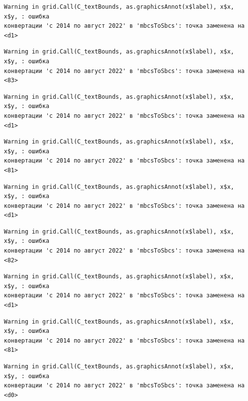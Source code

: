 \documentclass[
  letterpaper,
  DIV=11,
  numbers=noendperiod]{scrreprt}
\begin{document}
\begin{verbatim}
Warning in grid.Call(C_textBounds, as.graphicsAnnot(x$label), x$x, x$y, : ошибка
конвертации 'с 2014 по август 2022' в 'mbcsToSbcs': точка заменена на <d1>
\end{verbatim}

\begin{verbatim}
Warning in grid.Call(C_textBounds, as.graphicsAnnot(x$label), x$x, x$y, : ошибка
конвертации 'с 2014 по август 2022' в 'mbcsToSbcs': точка заменена на <83>
\end{verbatim}

\begin{verbatim}
Warning in grid.Call(C_textBounds, as.graphicsAnnot(x$label), x$x, x$y, : ошибка
конвертации 'с 2014 по август 2022' в 'mbcsToSbcs': точка заменена на <d1>
\end{verbatim}

\begin{verbatim}
Warning in grid.Call(C_textBounds, as.graphicsAnnot(x$label), x$x, x$y, : ошибка
конвертации 'с 2014 по август 2022' в 'mbcsToSbcs': точка заменена на <81>
\end{verbatim}

\begin{verbatim}
Warning in grid.Call(C_textBounds, as.graphicsAnnot(x$label), x$x, x$y, : ошибка
конвертации 'с 2014 по август 2022' в 'mbcsToSbcs': точка заменена на <d1>
\end{verbatim}

\begin{verbatim}
Warning in grid.Call(C_textBounds, as.graphicsAnnot(x$label), x$x, x$y, : ошибка
конвертации 'с 2014 по август 2022' в 'mbcsToSbcs': точка заменена на <82>
\end{verbatim}

\begin{verbatim}
Warning in grid.Call(C_textBounds, as.graphicsAnnot(x$label), x$x, x$y, : ошибка
конвертации 'с 2014 по август 2022' в 'mbcsToSbcs': точка заменена на <d1>
\end{verbatim}

\begin{verbatim}
Warning in grid.Call(C_textBounds, as.graphicsAnnot(x$label), x$x, x$y, : ошибка
конвертации 'с 2014 по август 2022' в 'mbcsToSbcs': точка заменена на <81>
\end{verbatim}

\begin{verbatim}
Warning in grid.Call(C_textBounds, as.graphicsAnnot(x$label), x$x, x$y, : ошибка
конвертации 'с 2014 по август 2022' в 'mbcsToSbcs': точка заменена на <d0>
\end{verbatim}
\end{document}
